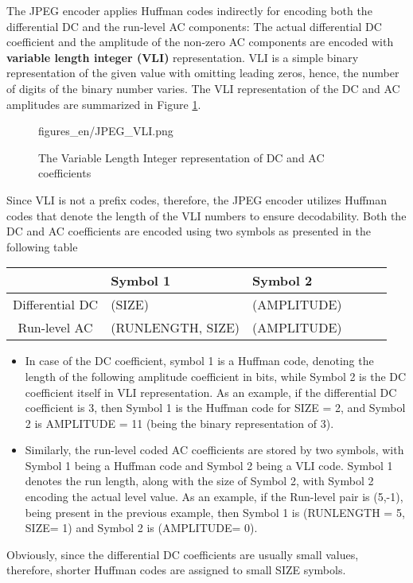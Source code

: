 \vspace{3mm}
The JPEG encoder applies Huffman codes indirectly for encoding both the differential DC and the run-level AC components:
The actual differential DC coefficient and the amplitude of the non-zero AC components are encoded with \textbf{variable length integer (VLI)} representation.
VLI is a simple binary representation of the given value with omitting leading zeros, hence, the number of digits of the binary number varies.
The VLI representation of the DC and AC amplitudes are summarized in Figure \ref{Fig:JPEG_VLI}.
\begin{figure}[]
	\centering
	\begin{overpic}[width = 0.8\columnwidth ]{figures_en/JPEG_VLI.png}
	\end{overpic}
	\caption{The Variable Length Integer representation of DC and AC coefficients}
	\label{Fig:JPEG_VLI}
\end{figure}

Since VLI is not a prefix codes, therefore, the JPEG encoder utilizes Huffman codes that denote the length of the VLI numbers to ensure decodability.
Both the DC and AC coefficients are encoded using two symbols as presented in the following table
\begin{table}[h!]
\renewcommand*{\arraystretch}{2.25}
\label{tab:JPEG_symbols}
\begin{center}
    \begin{tabular}[h!]{ @{}c | l | l | l | l | l @{} }%
 & Symbol 1 &    Symbol 2  \\ \hline
Differential DC    &  (SIZE)  & (AMPLITUDE) \\
Run-level AC     &   (RUNLENGTH, SIZE) &    (AMPLITUDE)\\
\end{tabular}
\end{center}
\end{table}
\begin{itemize}
\item In case of the DC coefficient, symbol 1 is a Huffman code, denoting the length of the following amplitude coefficient in bits, while Symbol 2 is the DC coefficient itself in VLI representation.
As an example, if the differential DC coefficient is 3, then Symbol 1 is the Huffman code for SIZE = 2, and Symbol 2 is AMPLITUDE = 11 (being the binary representation of 3).
\item Similarly, the run-level coded AC coefficients are stored by two symbols, with Symbol 1 being a Huffman code and Symbol 2 being a VLI code.
Symbol 1 denotes the run length, along with the size of Symbol 2, with Symbol 2 encoding the actual level value.
As an example, if the Run-level pair is (5,-1), being present in the previous example, then Symbol 1 is (RUNLENGTH = 5, SIZE= 1) and Symbol 2 is (AMPLITUDE= 0).
\end{itemize}
Obviously, since the differential DC coefficients are usually small values, therefore, shorter Huffman codes are assigned to small SIZE symbols.


